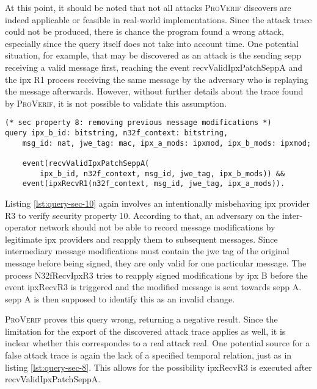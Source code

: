 At this point, it should be noted that not all attacks \textsc{ProVerif} discovers are indeed applicable or feasible in real-world implementations.
Since the attack trace could not be produced, there is chance the program found a wrong attack, especially since the query itself does not take into account time.
One potential situation, for example, that may be discovered as an attack is the sending \gls{sepp} receiving a valid message first, reaching the event {\sffamily recvValidIpxPatchSeppA} and the \gls{ipx} R1 process receiving the same message by the adversary who is replaying the message afterwards.
However, without further details about the trace found by \textsc{ProVerif}, it is not possible to validate this assumption.

\begin{lstlisting}[caption={Query for security property 8},label={lst:query-sec-8},firstnumber=221]
(* sec property 8: removing previous message modifications *)
query ipx_b_id: bitstring, n32f_context: bitstring,
    msg_id: nat, jwe_tag: mac, ipx_a_mods: ipxmod, ipx_b_mods: ipxmod;

    event(recvValidIpxPatchSeppA(
        ipx_b_id, n32f_context, msg_id, jwe_tag, ipx_b_mods)) &&
    event(ipxRecvR1(n32f_context, msg_id, jwe_tag, ipx_a_mods)).
\end{lstlisting}


Listing \ref{lst:query-sec-10} again involves an intentionally misbehaving \gls{ipx} provider R3 to verify security property 10.
According to that, an adversary on the inter-operator network should not be able to record message modifications by legitimate \gls{ipx} providers and reapply them to subsequent messages.
Since intermediary message modifications must contain the \gls{jwe} tag of the original message before being signed, they are only valid for one particular message.
The process {\sffamily N32fRecvIpxR3} tries to reapply signed modifications by \gls{ipx} B before the event {\sffamily ipxRecvR3} is triggered and the modified message is sent towards \gls{sepp} A.
\gls{sepp} A is then supposed to identify this as an invalid change.

\textsc{ProVerif} proves this query wrong, returning a negative result.
Since the limitation for the export of the discovered attack trace applies as well, it is inclear whether this correspondes to a real attack real.
One potential source for a false attack trace is again the lack of a specified temporal relation, just as in listing \ref{lst:query-sec-8}.
This allows for the possibility {\sffamily ipxRecvR3} is executed after {\sffamily recvValidIpxPatchSeppA}.

